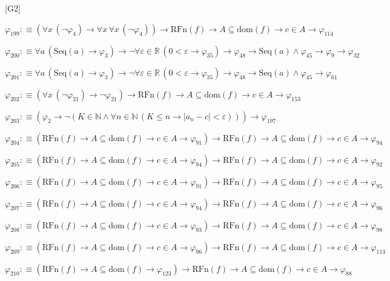 \begin{fullproof}{[G2]}
\begin{abbrevlist}
\item $\varphi_{199} :\equiv (\forall x\,(\neg \varphi_{4}) \to \forall x\,\forall x\,(\neg \varphi_{4})) \to \mathrm{RFn}(f) \to A \subseteq \mathrm{dom}(f) \to c \in A \to \varphi_{114}$
\item $\varphi_{200} :\equiv \forall a\,(\mathrm{Seq}(a) \to \varphi_{3}) \to \neg \forall \varepsilon \in \mathbb{R}\,(0 < \varepsilon \to \varphi_{35}) \to \varphi_{48} \to \mathrm{Seq}(a) \land \varphi_{45} \to \varphi_{9} \to \varphi_{32}$
\item $\varphi_{201} :\equiv \forall a\,(\mathrm{Seq}(a) \to \varphi_{3}) \to \neg \forall \varepsilon \in \mathbb{R}\,(0 < \varepsilon \to \varphi_{35}) \to \varphi_{48} \to \mathrm{Seq}(a) \land \varphi_{45} \to \varphi_{61}$
\item $\varphi_{202} :\equiv (\forall x\,(\neg \varphi_{21}) \to \neg \varphi_{21}) \to \mathrm{RFn}(f) \to A \subseteq \mathrm{dom}(f) \to c \in A \to \varphi_{153}$
\item $\varphi_{203} :\equiv (\varphi_{2} \to \neg (K \in \mathbb{N} \land \forall n \in \mathbb{N}\,(K \leq n \to \lvert a_{n} - c \rvert < \varepsilon))) \to \varphi_{197}$
\item $\varphi_{204} :\equiv (\mathrm{RFn}(f) \to A \subseteq \mathrm{dom}(f) \to c \in A \to \varphi_{91}) \to \mathrm{RFn}(f) \to A \subseteq \mathrm{dom}(f) \to c \in A \to \varphi_{94}$
\item $\varphi_{205} :\equiv (\mathrm{RFn}(f) \to A \subseteq \mathrm{dom}(f) \to c \in A \to \varphi_{94}) \to \mathrm{RFn}(f) \to A \subseteq \mathrm{dom}(f) \to c \in A \to \varphi_{92}$
\item $\varphi_{206} :\equiv (\mathrm{RFn}(f) \to A \subseteq \mathrm{dom}(f) \to c \in A \to \varphi_{91}) \to \mathrm{RFn}(f) \to A \subseteq \mathrm{dom}(f) \to c \in A \to \varphi_{95}$
\item $\varphi_{207} :\equiv (\mathrm{RFn}(f) \to A \subseteq \mathrm{dom}(f) \to c \in A \to \varphi_{94}) \to \mathrm{RFn}(f) \to A \subseteq \mathrm{dom}(f) \to c \in A \to \varphi_{96}$
\item $\varphi_{208} :\equiv (\mathrm{RFn}(f) \to A \subseteq \mathrm{dom}(f) \to c \in A \to \varphi_{93}) \to \mathrm{RFn}(f) \to A \subseteq \mathrm{dom}(f) \to c \in A \to \varphi_{98}$
\item $\varphi_{209} :\equiv (\mathrm{RFn}(f) \to A \subseteq \mathrm{dom}(f) \to c \in A \to \varphi_{96}) \to \mathrm{RFn}(f) \to A \subseteq \mathrm{dom}(f) \to c \in A \to \varphi_{113}$
\item $\varphi_{210} :\equiv (\mathrm{RFn}(f) \to A \subseteq \mathrm{dom}(f) \to \varphi_{123}) \to \mathrm{RFn}(f) \to A \subseteq \mathrm{dom}(f) \to c \in A \to \varphi_{88}$

\end{abbrevlist}
\end{fullproof}
